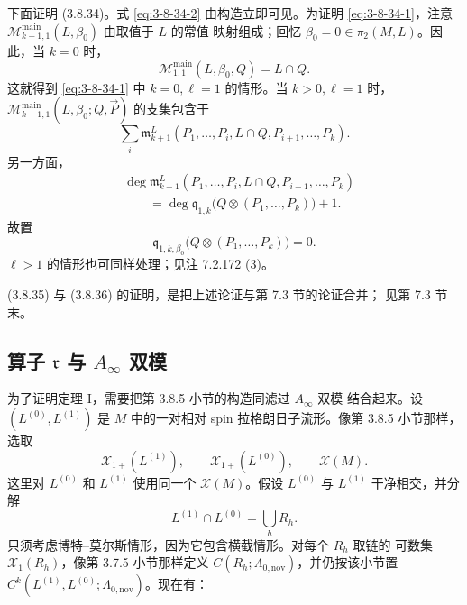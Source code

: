 下面证明 (3.8.34)。式 \eqref{eq:3-8-34-2} 由构造立即可见。为证明
\eqref{eq:3-8-34-1}，注意
$\mathcal M_{k+1,1}^{\mathrm{main}}(L,\beta_0)$ 由取值于 $L$ 的常值
映射组成；回忆 $\beta_0=0\in\pi_2(M,L)$。因此，当 $k=0$ 时，
\[
 \mathcal M_{1,1}^{\mathrm{main}}(L,\beta_0,Q)
 =
 L\cap Q.
\]
这就得到 \eqref{eq:3-8-34-1} 中 $k=0,\ell=1$ 的情形。当
$k>0,\ell=1$ 时，
$\mathcal M_{k+1,1}^{\mathrm{main}}(L,\beta_0;Q,\vec P)$ 的支集包含于
\[
 \sum_i
 \mathfrak m_{k+1}^L
 (P_1,\ldots,P_i,L\cap Q,P_{i+1},\ldots,P_k).
\]
另一方面，
\[
\begin{aligned}
 &\deg
 \mathfrak m_{k+1}^L
 (P_1,\ldots,P_i,L\cap Q,P_{i+1},\ldots,P_k)\\
 &\qquad=
 \deg\mathfrak q_{1,k}
 \bigl(Q\otimes(P_1,\ldots,P_k)\bigr)+1.
\end{aligned}
\]
故置
\[
 \mathfrak q_{1,k,\beta_0}
 \bigl(Q\otimes(P_1,\ldots,P_k)\bigr)=0.
\]
$\ell>1$ 的情形也可同样处理；见注 7.2.172 (3)。

(3.8.35) 与 (3.8.36) 的证明，是把上述论证与第 7.3 节的论证合并；
见第 7.3 节末。

\subsection{算子 \texorpdfstring{$\mathfrak r$}{r} 与
\texorpdfstring{$A_\infty$}{A-infinity} 双模}
\label{subsec:3-8-7}

为了证明定理 I，需要把第 3.8.5 小节的构造同滤过 $A_\infty$ 双模
结合起来。设 $(L^{(0)},L^{(1)})$ 是 $M$ 中的一对相对 spin
拉格朗日子流形。像第 3.8.5 小节那样，选取
\[
 \mathcal X_{1+}(L^{(1)}),\qquad
 \mathcal X_{1+}(L^{(0)}),\qquad
 \mathcal X(M).
\]
这里对 $L^{(0)}$ 和 $L^{(1)}$ 使用同一个 $\mathcal X(M)$。假设
$L^{(0)}$ 与 $L^{(1)}$ 干净相交，并分解
\[
 L^{(1)}\cap L^{(0)}=\bigcup_h R_h.
\]
只须考虑博特--莫尔斯情形，因为它包含横截情形。对每个 $R_h$ 取链的
可数集 $\mathcal X_1(R_h)$，像第 3.7.5 小节那样定义
$C(R_h;\Lambda_{0,\mathrm{nov}})$，并仍按该小节置
$C^k(L^{(1)},L^{(0)};\Lambda_{0,\mathrm{nov}})$。现在有：

